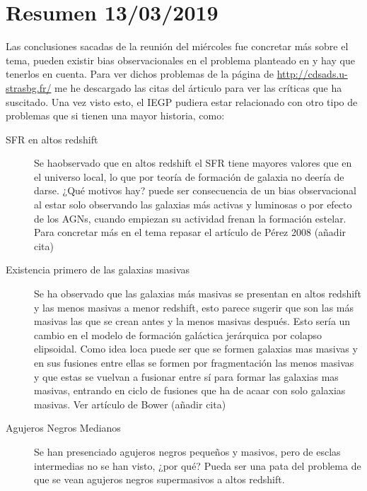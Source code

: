 
\section*{Resumen 13/03/2019}
Las conclusiones sacadas de la reunión del miércoles fue concretar más sobre el tema, pueden existir bias observacionales en el problema planteado en \cite{steinhardt2016impossibly} y hay que tenerlos en cuenta. Para ver dichos problemas de la página de \url{http://cdsads.u-strasbg.fr/} me he descargado las citas del árticulo para ver las críticas que ha suscitado. Una vez visto esto, el IEGP pudiera estar relacionado con otro tipo de problemas que si tienen una mayor historia, como:
\begin{description}
\item[SFR en altos redshift] Se haobservado que en altos redshift el SFR tiene mayores valores que en el universo local, lo que por teoría de formación de galaxia no deería de darse. ¿Qué motivos hay? puede ser consecuencia de un bias observacional al estar solo observando las galaxias más activas y luminosas o por efecto de los AGNs, cuando empiezan su actividad frenan la formación estelar. Para concretar más en el tema repasar el artículo de Pérez 2008 (añadir cita)
\item[Existencia primero de las galaxias masivas] Se ha observado que las galaxias más masivas se presentan en altos redshift y las menos masivas a menor redshift, esto parece sugerir que son las más masivas las que se crean antes y la menos masivas después. Esto sería un cambio en el modelo de formación galáctica jerárquica por colapso elipsoidal. Como idea loca puede ser que se formen galaxias mas masivas y en sus fusiones entre ellas se formen por fragmentación las menos masivas y que estas se vuelvan a fusionar entre sí para formar las galaxias mas masivas, entrando en ciclo de fusiones que ha de acaar con solo galaxias masivas. Ver artículo de Bower (añadir cita)
\item[Agujeros Negros Medianos] Se han presenciado agujeros negros pequeños y masivos, pero de esclas intermedias no se han visto, ¿por qué? Pueda ser una pata del problema de que se vean agujeros negros supermasivos a altos redshift.
\end{description}

